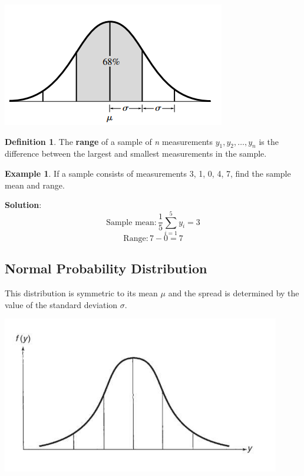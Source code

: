\documentclass[12pt]{book}
\theoremstyle{definition}
\newtheorem{exmp}{Example}[section]
\newtheorem{definition}{Definition}[section]
\begin{document}
\begin{center}
    \includegraphics[scale=0.9]{../assets/bell-shape.png}
\end{center}

\begin{definition}
    The \textbf{range} of a sample of \textit{n} measurements $y_1, y_2, \dots, y_n$ is the difference between the largest and smallest measurements in the sample.
\end{definition}

\begin{exmp}
    If a sample consists of measurements 3, 1, 0, 4, 7, find the sample mean and range.

    \textbf{Solution}: 
    \[
        \text{Sample mean}: \frac{1}{5} \sum_{i = 1}^{5} y_i = 3
    \]
    \[
        \text{Range}: 7 - 0 = 7
    \]
\end{exmp}

\subsection{Normal Probability Distribution}
This distribution is symmetric to its mean $\mu$ and the spread is determined by the value of the standard deviation $\sigma$.
\begin{center}
    \includegraphics[scale=0.8]{../assets/normal-distrib.png}
\end{center}
\end{document}
